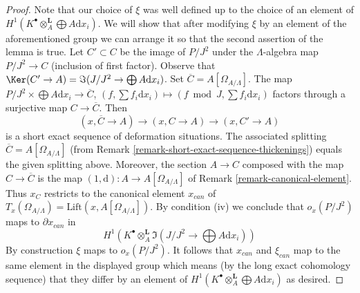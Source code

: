 \begin{proof}
\medskip\noindent
Note that our choice of $\xi$ was well defined up to the choice of an
element of $H^1(K^\bullet \otimes_A^\mathbf{L} \bigoplus A\text{d}x_i)$.
We will show that after modifying $\xi$ by an element of the aforementioned
group we can arrange it so that the second assertion of the lemma is true.
Let $C' \subset C$ be the image of $P/J^2$ under the
$\Lambda$-algebra map $P/J^2 \to C$ (inclusion of first factor).
Observe that
$\Ker(C' \to A) = \Im(J/J^2 \to \bigoplus A\text{d}x_i)$.
Set $\overline{C} = A[\Omega_{A/\Lambda}]$. The map
$P/J^2 \times \bigoplus A \text{d}x_i \to \overline{C}$,
$(f, \sum f_i \text{d}x_i) \mapsto (f \bmod J, \sum f_i \text{d}x_i)$
factors through a surjective map $C \to \overline{C}$. Then
$$
(x, \overline{C} \to A) \to (x, C \to A) \to (x, C' \to A)
$$
is a short exact sequence of deformation situations. The
associated splitting $\overline{C} = A[\Omega_{A/\Lambda}]$ (from
Remark \ref{remark-short-exact-sequence-thickenings}) equals the given
splitting above. Moreover, the section $A \to C$ composed with the map
$C \to \overline{C}$
is the map $(1, \text{d}) : A \to A[\Omega_{A/\Lambda}]$ of
Remark \ref{remark-canonical-element}.
Thus $x_C$ restricts to the canonical element $x_{can}$ of
$T_x(\Omega_{A/\Lambda}) = \text{Lift}(x, A[\Omega_{A/\Lambda}])$.
By condition (iv) we conclude that $o_x(P/J^2)$ maps to $\partial x_{can}$
in
$$
H^1(K^\bullet \otimes_A^\mathbf{L} \Im(J/J^2 \to \bigoplus A\text{d}x_i))
$$
By construction $\xi$ maps to $o_x(P/J^2)$. It follows that
$x_{can}$ and $\xi_{can}$ map to the same element in the
displayed group which means (by the long exact cohomology sequence)
that they differ by an element of
$H^1(K^\bullet \otimes_A^\mathbf{L} \bigoplus A\text{d}x_i)$
as desired.
\end{proof}